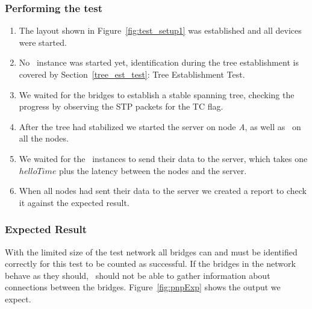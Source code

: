 \subsubsection*{Performing the test}
\begin{enumerate}
    \item The layout shown in Figure~\ref{fig:test_setup1} was established and all devices were started.
    \item No \tool\ instance was started yet, identification during the tree establishment is covered by Section~\ref{tree_est_test}: Tree Establishment Test.
    \item We waited for the bridges to establish a stable spanning tree, checking the progress by observing the STP packets for the TC flag.
    \item After the tree had stabilized we started the server on node \textit{A}, as well as \tool\ on all the nodes.
    \item We waited for the \tool\ instances to send their data to the server, which takes one $helloTime$ plus the latency between the nodes and the server.
    \item When all nodes had sent their data to the server we created a report to check it against the expected result.
\end{enumerate}
\subsubsection*{Expected Result}
With the limited size of the test network all bridges can and must be identified correctly for this test to be counted as successful.
If the bridges in the network behave as they should, \tool\ should not be able to gather information about connections between the bridges.
Figure~\ref{fig:pnpExp} shows the output we expect.

